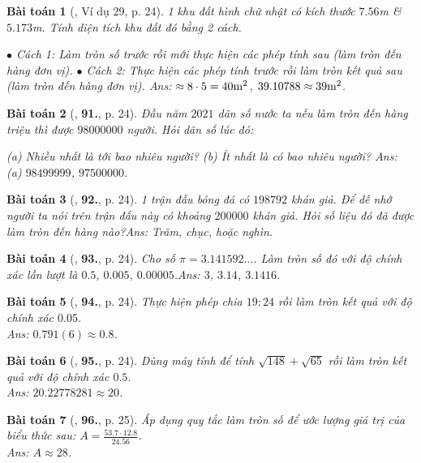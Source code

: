 \documentclass{article}
\newtheorem{baitoan}{Bài toán}
\begin{document}
\begin{baitoan}[\cite{Tuyen_Toan_7}, Ví dụ 29, p. 24]
	1 khu đất hình chữ nhật có kích thước $7.56$\emph{m} \& $5.173$\emph{m}. Tính diện tích khu đất đó bằng 2 cách.
	
		$\bullet$ Cách 1: Làm tròn số trước rồi mới thực hiện các phép tính sau (làm tròn đến hàng đơn vị).
		$\bullet$ Cách 2: Thực hiện các phép tính trước rồi làm tròn kết quả sau (làm tròn đến hàng đơn vị).
	\hfill{\sf Ans:} $\approx\rm 8\cdot 5 = 40m^2$, $\rm39.10788\approx 39m^2$.
\end{baitoan}

\begin{baitoan}[\cite{Tuyen_Toan_7}, \textbf{91.}, p. 24]
	Đầu năm $2021$ dân số nước ta nếu làm tròn đến hàng triệu thì được $98000000$ người. Hỏi dân số lúc đó:
	
		(a) Nhiều nhất là tới bao nhiêu người?
		(b) Ít nhất là có bao nhiêu người? 
	\hfill{\sf Ans:} (a) $98499999$, $97500000$.
\end{baitoan}

\begin{baitoan}[\cite{Tuyen_Toan_7}, \textbf{92.}, p. 24]
	1 trận đấu bóng đá có $198 792$ khán giả. Để dễ nhớ người ta nói trên trận đấu này có khoảng $200000$ khán giả. Hỏi số liệu đó đã được làm tròn đến hàng nào?\hfill{\sf Ans:} Trăm, chục, hoặc nghìn.
\end{baitoan}

\begin{baitoan}[\cite{Tuyen_Toan_7}, \textbf{93.}, p. 24]
	Cho số $\pi = 3.141592\ldots$. Làm tròn số đó với độ chính xác lần lượt là $0.5$, $0.005$, $0.00005$.\hfill{\sf Ans:} $3$, $3.14$, $3.1416$.
\end{baitoan}

\begin{baitoan}[\cite{Tuyen_Toan_7}, \textbf{94.}, p. 24]
	Thực hiện phép chia $19:24$ rồi làm tròn kết quả với độ chính xác $0.05$.\\\mbox{}\hfill{\sf Ans:} $0.791(6)\approx0.8$.
\end{baitoan}

\begin{baitoan}[\cite{Tuyen_Toan_7}, \textbf{95.}, p. 24]
	Dùng máy  tính để tính $\sqrt{148} + \sqrt{65}$ rồi làm tròn kết quả với độ chính xác $0.5$.\\\mbox{}\hfill{\sf Ans:} $20.22778281\approx20$.
\end{baitoan}

\begin{baitoan}[\cite{Tuyen_Toan_7}, \textbf{96.}, p. 25]
	Áp dụng quy tắc làm tròn số để ước lượng giá trị của biểu thức sau: $A = \frac{53.7\cdot 12.8}{24.56}$.\\\mbox{}\hfill{\sf Ans:} $A\approx 28$.
\end{baitoan}
\end{document}
